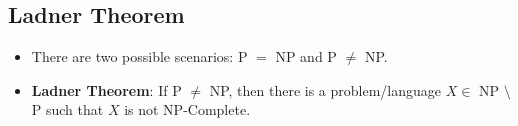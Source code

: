 \subsection{Ladner Theorem}
\begin{itemize}
    \item There are two possible scenarios: P $=$ NP and P $\neq$ NP.
    \item \textbf{Ladner Theorem}: If P $\neq$ NP, then there is a problem/language $X \in$ NP $\setminus$ P such that $X$ is not NP-Complete.
\end{itemize}

